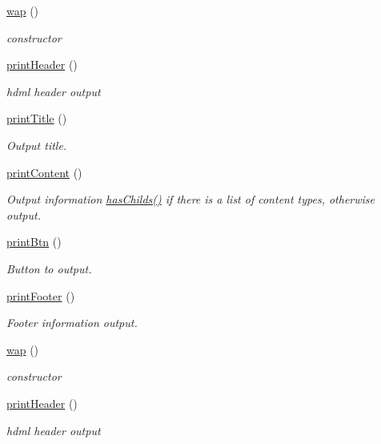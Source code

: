 \begin{DoxyCompactItemize}
\item 
\hyperlink{classwap_a7b4befeef8257c63a0ffe3012a84560b}{wap} ()
\begin{DoxyCompactList}\small\item\em constructor \end{DoxyCompactList}\item 
\hyperlink{classwap_a402c6a180ae759c7a173a67441dfb716}{print\-Header} ()
\begin{DoxyCompactList}\small\item\em hdml header output \end{DoxyCompactList}\item 
\hyperlink{classwap_a048fa1324853c9d69e795c7d34f7ad8b}{print\-Title} ()
\begin{DoxyCompactList}\small\item\em Output title. \end{DoxyCompactList}\item 
\hyperlink{classwap_a1edebe2b6a90ec08ab149ad2b2866dbd}{print\-Content} ()
\begin{DoxyCompactList}\small\item\em Output information \hyperlink{classmobileXE_a680f6a6b774bf12be4c67b6a9215f1ea}{has\-Childs()} if there is a list of content types, otherwise output. \end{DoxyCompactList}\item 
\hyperlink{classwap_a47437aad53e77ce53aebb4db6240cc38}{print\-Btn} ()
\begin{DoxyCompactList}\small\item\em Button to output. \end{DoxyCompactList}\item 
\hyperlink{classwap_a1fd1c1dca866c9b6653499cabf124980}{print\-Footer} ()
\begin{DoxyCompactList}\small\item\em Footer information output. \end{DoxyCompactList}\item 
\hyperlink{classwap_a7b4befeef8257c63a0ffe3012a84560b}{wap} ()
\begin{DoxyCompactList}\small\item\em constructor \end{DoxyCompactList}\item 
\hyperlink{classwap_a402c6a180ae759c7a173a67441dfb716}{print\-Header} ()
\begin{DoxyCompactList}\small\item\em hdml header output \end{DoxyCompactList}\item 

\end{DoxyCompactItemize}
